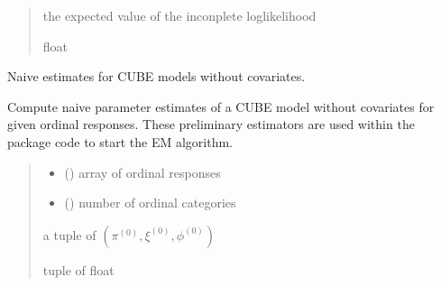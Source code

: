 \documentclass[letterpaper,10pt,english]{sphinxmanual}
\begin{document}
\begin{fulllineitems}
\begin{quote}
\begin{description}
\begin{itemize}
\end{itemize}

\sphinxAtStartPar
the expected value of the inconplete log\sphinxhyphen{}likelihood

\sphinxAtStartPar
float

\end{description}\end{quote}

\end{fulllineitems}


\begin{fulllineitems}
\label{\detokenize{cubmods:cubmods.cube.init_theta}}
\pysigstartsignatures
{}
\pysigstopsignatures
\sphinxAtStartPar
Naive estimates for CUBE models without covariates.

\sphinxAtStartPar
Compute naive parameter estimates of a CUBE model without covariates for given ordinal responses. 
These preliminary estimators are used within the package code to start the E\sphinxhyphen{}M algorithm.
\begin{quote}\begin{description}
\begin{itemize}
\item {} 
\sphinxAtStartPar
{} () \textendash{} array of ordinal responses

\item {} 
\sphinxAtStartPar
{} () \textendash{} number of ordinal categories

\end{itemize}

\sphinxAtStartPar
a tuple of \((\pi^{(0)}, \xi^{(0)}, \phi^{(0)})\)

\sphinxAtStartPar
tuple of float

\end{description}\end{quote}

\end{fulllineitems}
\end{document}
